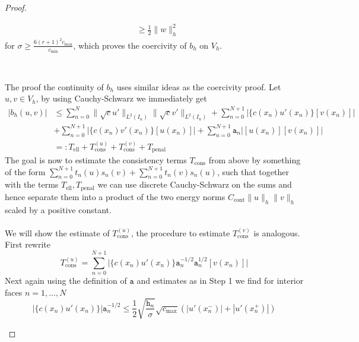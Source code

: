 \begin{proof}
\begin{proofstep}[Coercivity]
\begin{align*}
			         & \geq \frac{1}{2} \|w\|_h^2
		\end{align*}
		for $\sigma \geq \frac{6 (r+1)^2 c_{\max} }{c_{\min}}$, which proves the coercivity
		of $b_h$ on $V_h$.
	\end{proofstep}
	\\
	\begin{proofstep}[Continuity]
		The proof the continuity of $b_h$ uses similar ideas as the coercivity proof. Let
		$u,v \in V_h$, by using Cauchy-Schwarz we
		immediately get
		\begin{align}
			|b_h(u,v)| & \leq \sum_{n=0}^{N} \|\sqrt{c}u'\|_{L^2(I_n)} \|\sqrt{c}v'\|_{L^2(I_n)}
			+  \sum_{n=0}^{N+1} \big| \{c(x_n)u'(x_n)\}[v(x_n)] \big| \nonumber                               \\
			           & +\sum_{n=0}^{N+1} \big|\{c(x_n)v'(x_n)\}[u(x_n)]\big|
			+\sum_{n=0}^{N+1} \texttt{a}_n \big|[u(x_n)][v(x_n)]\big| \nonumber                               \\
			           & =: T_{\text{ell}} + T_{\text{cons}}^{(u)} + T_{\text{cons}}^{(v)} + T_{\text{penal}}
			\label{eq:cont_thr_estimate_elliptic_part}
		\end{align}
		The goal is now to estimate the consistency terms $T_{\text{cons}}$ from above by something of the form
		$ \sum_{n=0}^{N+1} t_n(u) s_n(v) + \sum_{n=0}^{N+1} t_n(v) s_n(u)$, such that together with the terms
		$T_{\text{ell}}, T_{\text{penal}}$ we can use discrete Cauchy-Schwarz on the sums and hence separate them into
		a product of the two energy norms $C_{\text{cont}} \|u\|_{h}\|v\|_{h} $ scaled by a positive constant. \\ \\
		We will show the estimate of $T_{\text{cons}}^{(u)}$, the procedure to estimate $T_{\text{cons}}^{(v)}$ is analogous. \\
		First rewrite
		\begin{equation}
			\label{eq:continuity_thr_consistency_term}
			T_{\text{cons}}^{(u)} = \sum_{n=0}^{N+1} \big| \{c(x_n)u'(x_n)\} \texttt{a}_n^{-1/2}\texttt{a}_n^{1/2} [v(x_n)] \big|
		\end{equation}
		Next again using the definition of $\texttt{a}$ and estimates as in Step 1 we find for interior faces $n = 1,\ldots,N$
		\begin{equation}
			\big|\{c(x_n)u'(x_n)\}\big|\texttt{a}_n^{-1/2}
			\leq \frac{1}{2} \sqrt{\frac{\texttt{h}_n}{\sigma}} \sqrt{c_{\max}}
			\left( |u'(x_n^-)| + |u'(x_n^+)| \right) \nonumber
		\end{equation}

\end{proofstep}
\end{proof}
